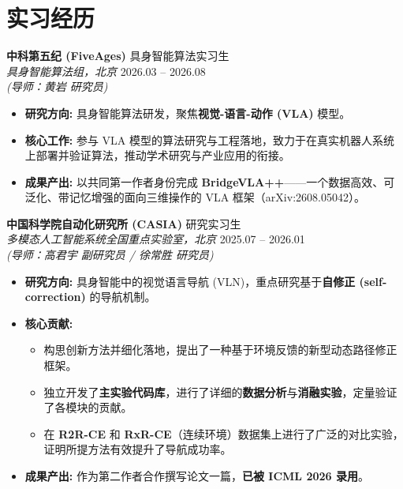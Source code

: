 \documentclass[11pt,a4paper]{article}
\begin{document}
\section{实习经历}
\textbf{中科第五纪 (FiveAges)} \hfill 具身智能算法实习生 \\
\textit{具身智能算法组，北京} \hfill 2026.03 -- 2026.08 \\
\textit{(导师：黄岩 研究员)}
\begin{itemize}
    \item \textbf{研究方向:} 具身智能算法研发，聚焦\textbf{视觉-语言-动作 (VLA)} 模型。
    \item \textbf{核心工作:} 参与 VLA 模型的算法研究与工程落地，致力于在真实机器人系统上部署并验证算法，推动学术研究与产业应用的衔接。
    \item \textbf{成果产出:} 以共同第一作者身份完成 \textbf{BridgeVLA++}——一个数据高效、可泛化、带记忆增强的面向三维操作的 VLA 框架（arXiv:2608.05042）。
\end{itemize}

\vspace{0.4em}
\textbf{中国科学院自动化研究所 (CASIA)} \hfill 研究实习生 \\
\textit{多模态人工智能系统全国重点实验室，北京} \hfill 2025.07 -- 2026.01 \\
\textit{(导师：高君宇 副研究员 / 徐常胜 研究员)}
\begin{itemize}
    \item \textbf{研究方向:} 具身智能中的视觉语言导航 (VLN)，重点研究基于\textbf{自修正 (self-correction)} 的导航机制。
    \item \textbf{核心贡献:} 
    \begin{itemize}
        \item 构思创新方法并细化落地，提出了一种基于环境反馈的新型动态路径修正框架。
        \item 独立开发了\textbf{主实验代码库}，进行了详细的\textbf{数据分析}与\textbf{消融实验}，定量验证了各模块的贡献。
        \item 在 \textbf{R2R-CE} 和 \textbf{RxR-CE}（连续环境）数据集上进行了广泛的对比实验，证明所提方法有效提升了导航成功率。
    \end{itemize}
    \item \textbf{成果产出:} 作为第二作者合作撰写论文一篇，\textbf{已被 ICML 2026 录用}。
\end{itemize}

\end{document}
